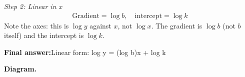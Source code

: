 \documentclass[11pt]{article}
\begin{document}
\textit{Step 2: Linear in x}
\[\begin{gathered}
\text{Gradient} = \log b, \quad \text{intercept} = \log k
\end{gathered}\]
Note the axes: this is \( \log y \) against \( x \), not \( \log x \). The gradient is \( \log b \) (not \( b \) itself) and the intercept is \( \log k \).

\begin{answerbox}
\textbf{Final answer:}\quad Linear form: log y = (log b)x + log k
\end{answerbox}
\textbf{Diagram.}

\begin{center}
\end{center}
\end{document}
